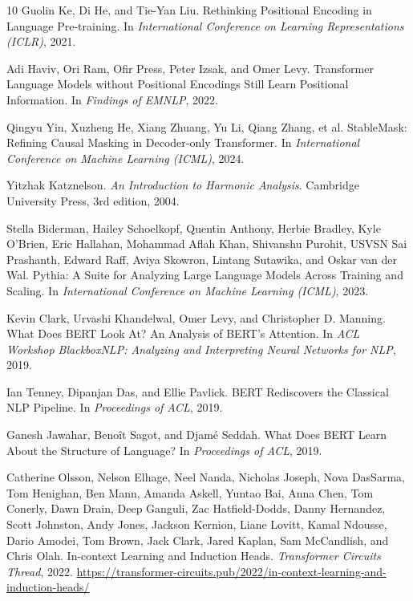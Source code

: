 \documentclass[11pt]{article}
\theoremstyle{definition}
\begin{document}
\begin{thebibliography}{10}
Guolin Ke, Di He, and Tie-Yan Liu.
\newblock Rethinking Positional Encoding in Language Pre-training.
\newblock In \emph{International Conference on Learning Representations (ICLR)}, 2021.

Adi Haviv, Ori Ram, Ofir Press, Peter Izsak, and Omer Levy.
\newblock Transformer Language Models without Positional Encodings Still Learn Positional Information.
\newblock In \emph{Findings of EMNLP}, 2022.

Qingyu Yin, Xuzheng He, Xiang Zhuang, Yu Li, Qiang Zhang, et al.
\newblock StableMask: Refining Causal Masking in Decoder-only Transformer.
\newblock In \emph{International Conference on Machine Learning (ICML)}, 2024.

Yitzhak Katznelson.
\newblock \emph{An Introduction to Harmonic Analysis}.
\newblock Cambridge University Press, 3rd edition, 2004.

Stella Biderman, Hailey Schoelkopf, Quentin Anthony, Herbie Bradley, Kyle O'Brien, Eric Hallahan, Mohammad Aflah Khan, Shivanshu Purohit, USVSN Sai Prashanth, Edward Raff, Aviya Skowron, Lintang Sutawika, and Oskar van der Wal.
\newblock Pythia: A Suite for Analyzing Large Language Models Across Training and Scaling.
\newblock In \emph{International Conference on Machine Learning (ICML)}, 2023.

Kevin Clark, Urvashi Khandelwal, Omer Levy, and Christopher D. Manning.
\newblock What Does BERT Look At? An Analysis of BERT's Attention.
\newblock In \emph{ACL Workshop BlackboxNLP: Analyzing and Interpreting Neural Networks for NLP}, 2019.

Ian Tenney, Dipanjan Das, and Ellie Pavlick.
\newblock BERT Rediscovers the Classical NLP Pipeline.
\newblock In \emph{Proceedings of ACL}, 2019.

Ganesh Jawahar, Beno\^it Sagot, and Djam\'e Seddah.
\newblock What Does BERT Learn About the Structure of Language?
\newblock In \emph{Proceedings of ACL}, 2019.

Catherine Olsson, Nelson Elhage, Neel Nanda, Nicholas Joseph, Nova DasSarma, Tom Henighan, Ben Mann, Amanda Askell, Yuntao Bai, Anna Chen, Tom Conerly, Dawn Drain, Deep Ganguli, Zac Hatfield-Dodds, Danny Hernandez, Scott Johnston, Andy Jones, Jackson Kernion, Liane Lovitt, Kamal Ndousse, Dario Amodei, Tom Brown, Jack Clark, Jared Kaplan, Sam McCandlish, and Chris Olah.
\newblock In-context Learning and Induction Heads.
\newblock \emph{Transformer Circuits Thread}, 2022.
\newblock \url{https://transformer-circuits.pub/2022/in-context-learning-and-induction-heads/}


\end{thebibliography}
\end{document}
